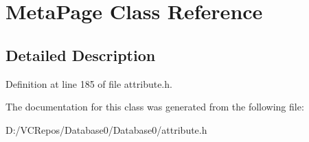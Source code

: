 \hypertarget{class_meta_page}{}\section{Meta\+Page Class Reference}
\label{class_meta_page}


\subsection{Detailed Description}


Definition at line 185 of file attribute.\+h.



The documentation for this class was generated from the following file\+:\begin{DoxyCompactItemize}
\item 
D\+:/\+V\+C\+Repos/\+Database0/\+Database0/attribute.\+h\end{DoxyCompactItemize}
